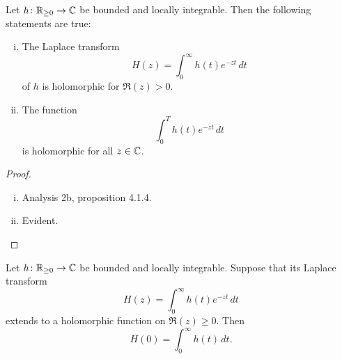\begin{lema}
Let $h \colon \mathbb{R}_{\geq 0} \to \mathbb{C}$ be bounded and locally
integrable. Then the following statements are true:

\begin{enumerate}[i)]
\item The Laplace transform
\[
H(z) = \int_0^\infty h(t) e^{-zt}\,dt
\]
of $h$ is holomorphic for $\Re(z) > 0$.
\item The function
\[
\int_0^T h(t) e^{-zt}\,dt
\]
is holomorphic for all $z \in \mathbb{C}$.
\end{enumerate}
\end{lema}

\begin{proof}
\phantom{i}
\begin{enumerate}[i)]
\item Analysis 2b, proposition 4.1.4.
\item Evident. \qedhere
\end{enumerate}
\end{proof}

\begin{izrek}
\label{prime:thm:ana}
Let $h \colon \mathbb{R}_{\geq 0} \to \mathbb{C}$ be bounded and locally
integrable. Suppose that its Laplace transform
\[
H(z) = \int_0^\infty h(t) e^{-zt}\,dt
\]
extends to a holomorphic function on $\Re(z) \geq 0$. Then
\[
H(0) = \int_0^\infty h(t)\,dt.
\]
\end{izrek}

